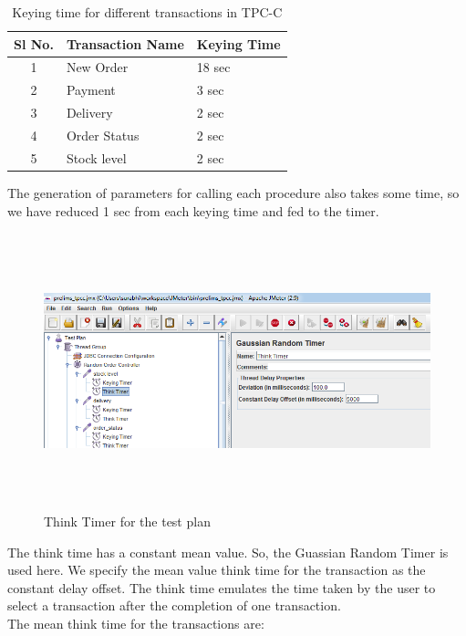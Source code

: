 \documentclass[12pt]{book}
\begin{document}
  \begin{table}[h]
   \begin{center}
    \begin{tabular}{|c|l|p{5cm}|} 
    \hline
    \textbf{Sl No.} & \textbf{Transaction Name} & \textbf{Keying Time}\\
    \hline
    1 & New Order & 18 sec \\
    \hline
    2 & Payment & 3 sec \\
    \hline
    3 & Delivery & 2 sec \\
    \hline
    4 & Order Status & 2 sec \\
    \hline
    5 & Stock level & 2 sec \\
    \hline    
    \end{tabular}
    \caption{Keying time for different transactions in TPC-C}
   \end{center}
  \end{table}
  
  The generation of parameters for calling each procedure also takes some time, so we have
  reduced 1 sec from each keying time and fed to the timer.
 
   \begin{figure}[H]
    \centering
    \includegraphics[width=15cm, height=8cm]{images/ntpcc_89}
    \caption{Think Timer for the test plan\label{fig:fig73_JMeter}}
   \end{figure} 
   
   The think time has a constant mean value. So, the Guassian Random Timer is used here. We
   specify the mean value think time for the transaction as the constant delay offset.
   The think time emulates the time taken by the user to select a transaction after the completion of one transaction.\\
   The mean think time for the transactions are:\\
   
\end{document}
